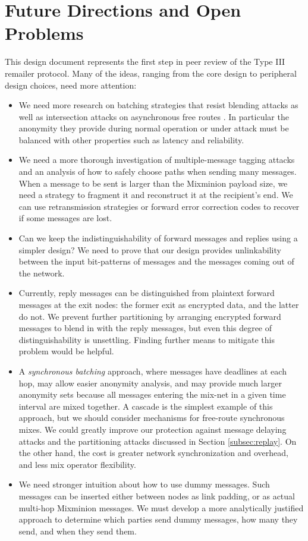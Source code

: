 \documentclass[11pt]{IEEEtran}
\begin{document}

\section{Future Directions and Open Problems}
\label{sec:conclusion}

This design document represents the first step in peer review of the
Type III remailer protocol. Many of the ideas, ranging from the core
design to peripheral design choices, need more attention:

\begin{itemize}
\item We need more research on batching strategies that resist blending
attacks \cite{batching-taxonomy} as well as intersection
attacks on asynchronous free routes \cite{disad-free-routes}. In
particular the anonymity they provide during normal operation or
under attack must be balanced with other properties such as latency
and reliability.
\item We need a more thorough investigation of multiple-message tagging
attacks and an analysis of how to safely choose paths when
sending many messages. When a message to be sent is larger than the
Mixminion payload size, we need a strategy to fragment
it and reconstruct it at the recipient's end. 
We can use retransmission strategies or forward error
correction codes to recover if some messages are lost.
\item Can we keep the indistinguishability of forward messages and
replies using a simpler design? We need to prove that our design provides
unlinkability between the input bit-patterns of messages and the messages
coming out of the network.
\item Currently, reply messages can be distinguished from plaintext forward
messages at the exit nodes: the former exit as encrypted data, and the
latter do not.  We prevent further partitioning by arranging 
encrypted forward messages to blend in with the reply messages, but even this
degree of distinguishability is unsettling.  Finding further means to
mitigate this problem would be helpful.
\item A \emph{synchronous batching} approach, where messages have
deadlines at each hop, may allow easier anonymity analysis, and may
provide much larger anonymity sets because all messages entering the
mix-net in a given time interval are mixed together. A cascade is the
simplest example of this approach, but we should consider mechanisms for
free-route synchronous mixes. We could greatly improve our protection
against message delaying attacks and the partitioning attacks discussed
in Section \ref{subsec:replay}. On the other hand, the cost is greater
network synchronization and overhead, and less mix operator flexibility.
\item We need stronger intuition about how to use dummy messages. Such
messages can be inserted either between nodes as link padding, or as
actual multi-hop Mixminion messages. We must develop a more analytically
justified approach to determine which parties send dummy messages, how many
they send, and when they send them.


\end{itemize}
\end{document}
